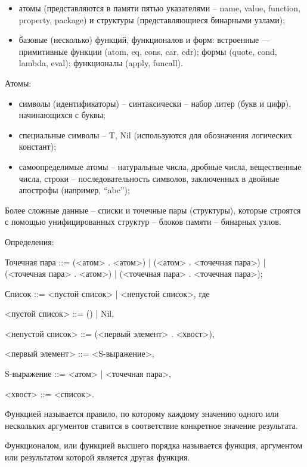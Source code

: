 \documentclass[12pt]{report}
\begin{document}
	\begin{itemize}
		\item атомы (представляются в памяти пятью указателями  --  name, value, function, property, package) и структуры (представляющиеся бинарными узлами);
		\item базовые (несколько) функций, функционалов и форм: встроенные — примитивные функции (atom, eq, cons, car, cdr); формы (quote, cond, lambda, eval); функционалы (apply, funcall).
	\end{itemize}
	
	Атомы:
	\begin{itemize} 
		\item символы (идентификаторы) – синтаксически – набор литер (букв и цифр), начинающихся с буквы;
		\item специальные символы – {T, Nil} (используются для обозначения логических констант);
		\item самоопределимые атомы – натуральные числа, дробные числа, вещественные числа, строки – последовательность символов, заключенных в двойные апострофы (например, “abc”);
	\end{itemize} 
	
	Более сложные данные – списки и точечные пары (структуры), которые строятся с помощью унифицированных структур – блоков памяти – бинарных узлов.
	
	Определения:
	
	Точечная пара ::= (<атом> . <атом>) | (<атом> . <точечная пара>) | (<точечная пара> . <атом>) | (<точечная пара> . <точечная пара>);
	
	Список ::= <пустой список> | <непустой список>, где 
	
	<пустой список> ::= () | Nil,
	
	<непустой список> ::= (<первый элемент> . <хвост>),
	
	<первый элемент> ::= <S-выражение>,
	
	S-выражение ::= <атом> | <точечная пара>,
	
	<хвост> ::= <список>.
	
	
	Функцией называется правило, по которому каждому значению одного или нескольких  аргументов ставится в соответствие конкретное значение результата. 
	
	
	Функционалом, или функцией высшего порядка называется функция, аргументом или  результатом которой является другая функция.
	
\end{document}
